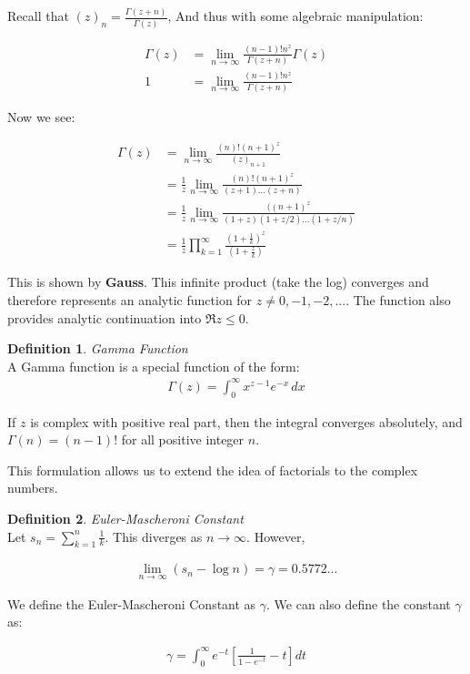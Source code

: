 \documentclass{article}
\theoremstyle{definition}
\newtheorem{definition}{Definition}[section]
\newcommand{\Def}[2]{
\begin{shaded*}
\begin{definition}{\textit{#1}}\\#2\end{definition}
\end{shaded*}
}
\begin{document}
Recall that $(z)_n = \frac{\Gamma(z+n)}{\Gamma(z)}$, And thus with some algebraic manipulation:

\begin{align*}
\Gamma(z) &= \lim_{n\to\infty}\frac{(n-1)!n^z}{\Gamma(z+n)}\Gamma(z) \\ 
1 &= \lim_{n\to\infty}\frac{(n-1)!n^z}{\Gamma(z+n)}
\end{align*}

Now we see:

\begin{align*}
\Gamma(z) &= \lim_{n\to\infty} \frac{(n)! (n+1)^z}{(z)_{n+1}} \\ 
 &= \frac{1}{z} \lim_{n\to\infty} \frac{(n)! (n+1)^z}{(z+1)...(z+n)} \\ 
  &= \frac{1}{z} \lim_{n\to\infty} \frac{((n+1)^z}{(1+z)(1+z/2)...(1+z/n)} \\ 
  &= \frac{1}{z} \prod_{k=1}^{\infty} \frac{(1+\frac{1}{k})^z}{(1+\frac{z}{k})}
\end{align*}

This is shown by \textbf{Gauss}. This infinite product (take the log) converges and therefore represents an analytic function for $z \neq 0, -1, -2,...$. The function also provides analytic continuation into $\Re{z} \leq 0$. 

\Def{Gamma Function}{
A Gamma function is a special function of the form:
\begin{align*}
\Gamma (z)=\int_{0}^{\infty}x^{z-1}e^{-x}\,dx
\end{align*}

If $z$ is complex with positive real part, then the integral converges absolutely, and $\Gamma(n) = (n-1)!$ for all positive integer $n$.

This formulation allows us to extend the idea of factorials to the complex numbers.
}

\Def{Euler-Mascheroni Constant}{
Let $s_n = \sum_{k=1}^n \frac{1}{k}$. This diverges as $n\to\infty$. However, 

\begin{align*}
\lim_{n\to\infty}(s_n - \log n) = \gamma = 0.5772...
\end{align*} 

We define the Euler-Mascheroni Constant as $\gamma$. 
We can also define the constant $\gamma$ as:

\begin{align*}
\gamma =  \int_0^\infty e^{-t} \left[\frac{1}{1-e^{-t}}-t\right]dt
\end{align*}
}
\end{document}
